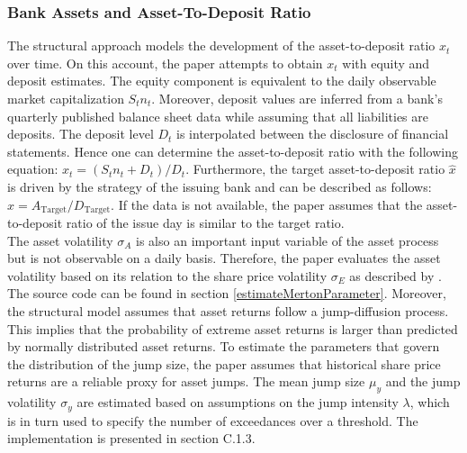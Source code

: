 \subsubsection*{Bank Assets and Asset-To-Deposit Ratio}
The structural approach models the development of the asset-to-deposit ratio $x_t$ over time. On this account, the paper attempts to obtain $x_t$ with equity and deposit estimates. The equity component is equivalent to the daily observable market capitalization $S_t n_t$. Moreover, deposit values are inferred from a bank's quarterly published balance sheet data while assuming that all liabilities are deposits. The deposit level $D_t$ is interpolated between the disclosure of financial statements. \citep{wilkens2014contingent} Hence one can determine the asset-to-deposit ratio with the following equation: $x_t = (S_t n_t + D_t)/D_t$. Furthermore, the target asset-to-deposit ratio $\hat{x}$ is driven by the strategy of the issuing bank and can be described as follows: $\hat{x} = A_\text{Target}/D_\text{Target}$. If the data is not available, the paper assumes that the asset-to-deposit ratio of the issue day is similar to the target ratio. \\

The asset volatility $\sigma_A$ is also an important input variable of the asset process but is not observable on a daily basis. Therefore, the paper evaluates the asset volatility based on its relation to the share price volatility $\sigma_E$ as described by \citet{merton1974pricing}. The source code can be found in section \ref{estimateMertonParameter}. Moreover, the structural model assumes that asset returns follow a jump-diffusion process. This implies that the probability of extreme asset returns is larger than predicted by normally distributed asset returns. To estimate the parameters that govern the distribution of the jump size, the paper assumes that historical share price returns are a reliable proxy for asset jumps. The mean jump size $\mu_y$ and the jump volatility $\sigma_y$ are estimated based on assumptions on the jump intensity $\lambda$, which is in turn used to specify the number of exceedances over a threshold. \citep{longin2001extreme} The implementation is presented in section C.1.3.

